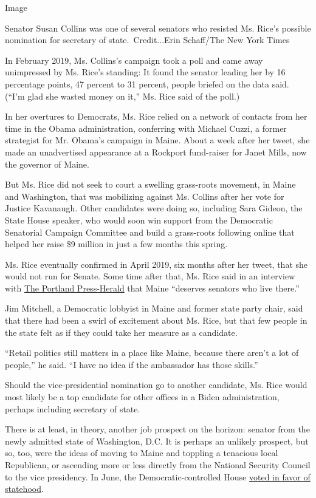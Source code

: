 Image

Senator Susan Collins was one of several senators who resisted Ms.
Rice's possible nomination for secretary of state.~Credit...Erin
Schaff/The New York Times

In February 2019, Ms. Collins's campaign took a poll and came away
unimpressed by Ms. Rice's standing: It found the senator leading her by
16 percentage points, 47 percent to 31 percent, people briefed on the
data said. (``I'm glad she wasted money on it,'' Ms. Rice said of the
poll.)

In her overtures to Democrats, Ms. Rice relied on a network of contacts
from her time in the Obama administration, conferring with Michael
Cuzzi, a former strategist for Mr. Obama's campaign in Maine. About a
week after her tweet, she made an unadvertised appearance at a Rockport
fund-raiser for Janet Mills, now the governor of Maine.

But Ms. Rice did not seek to court a swelling grass-roots movement, in
Maine and Washington, that was mobilizing against Ms. Collins after her
vote for Justice Kavanaugh. Other candidates were doing so, including
Sara Gideon, the State House speaker, who would soon win support from
the Democratic Senatorial Campaign Committee and build a grass-roots
following online that helped her raise \$9 million in just a few months
this spring.

Ms. Rice eventually confirmed in April 2019, six months after her tweet,
that she would not run for Senate. Some time after that, Ms. Rice said
in an interview with
\href{https://www.pressherald.com/2019/10/23/susan-rice-to-talk-about-new-book-maine-roots-during-portland-event/}{The
Portland Press-Herald} that Maine ``deserves senators who live there.''

Jim Mitchell, a Democratic lobbyist in Maine and former state party
chair, said that there had been a swirl of excitement about Ms. Rice,
but that few people in the state felt as if they could take her measure
as a candidate.

``Retail politics still matters in a place like Maine, because there
aren't a lot of people,'' he said. ``I have no idea if the ambassador
has those skills.''

Should the vice-presidential nomination go to another candidate, Ms.
Rice would most likely be a top candidate for other offices in a Biden
administration, perhaps including secretary of state.

There is at least, in theory, another job prospect on the horizon:
senator from the newly admitted state of Washington, D.C. It is perhaps
an unlikely prospect, but so, too, were the ideas of moving to Maine and
toppling a tenacious local Republican, or ascending more or less
directly from the National Security Council to the vice presidency. In
June, the Democratic-controlled House
\href{https://www.nytimes.com/2020/06/26/us/politics/dc-statehood-house-vote.html}{voted
in favor of statehood}.


